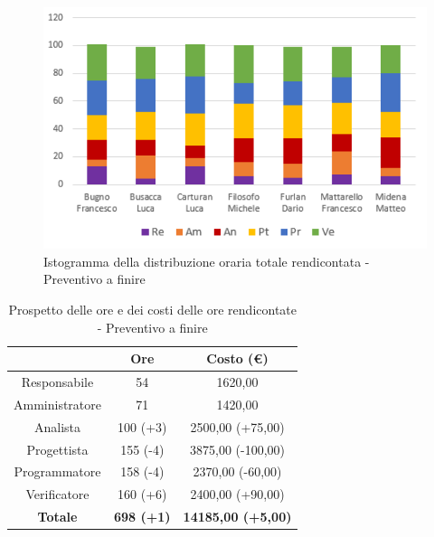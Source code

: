 \begin{figure}[H]
  \centering
  \includegraphics[scale=0.9]{immagini/ore_lavoro_preventivo_finire_RTB.png}
  \caption{Istogramma della distribuzione oraria totale rendicontata - Preventivo a finire}
\end{figure}


\begin{table}[H]
  \centering
  \renewcommand{\arraystretch}{1.8}
  \begin{tabular}{c|c|c}
    \rowcolor[HTML]{125E28}
    \multicolumn{1}{c}{\color[HTML]{FFFFFF}\textbf{Ruolo}}
                    & \multicolumn{1}{c}{\color[HTML]{FFFFFF}\textbf{Ore}}
                    & \multicolumn{1}{c}{\color[HTML]{FFFFFF}\textbf{Costo (€)}}                             \\
    \hline
    Responsabile    & 54                                                         & 1620,00                   \\
    Amministratore  & 71                                                         & 1420,00                   \\
    Analista        & 100 (+3)                                                   & 2500,00 (+75,00)          \\
    Progettista     & 155 (-4)                                                   & 3875,00 (-100,00)         \\
    Programmatore   & 158 (-4)                                                   & 2370,00 (-60,00)          \\
    Verificatore    & 160 (+6)                                                   & 2400,00 (+90,00)          \\
    \textbf{Totale} & \textbf{698 (+1)}                                          & \textbf{14185,00 (+5,00)} \\
  \end{tabular}
  \caption{Prospetto delle ore e dei costi delle ore rendicontate - Preventivo a finire}
\end{table}

